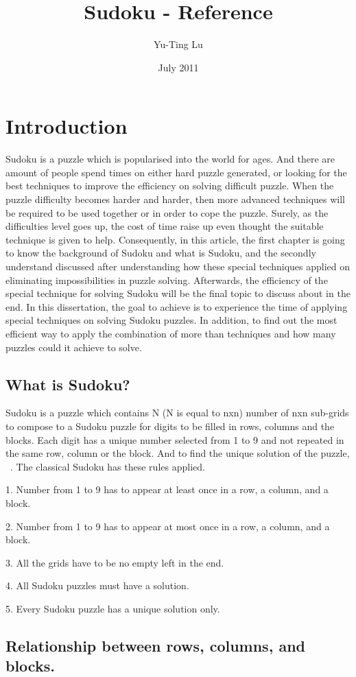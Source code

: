 \documentclass[11pt]{report}
\begin{document}
\title{Sudoku - Reference}
\author{Yu-Ting Lu}
\date{July 2011}
\maketitle

\tableofcontents

\chapter{Introduction}
\label{cha:Introduction}


Sudoku is a puzzle which is popularised into the world for ages. And there are amount of people spend times on either hard puzzle generated, or looking for the best techniques to improve the efficiency on solving difficult puzzle.
When the puzzle difficulty becomes harder and harder, then more advanced techniques will be required to be used together or in order to cope the puzzle. Surely, as the difficulties level goes up, the cost of time raise up even thought the suitable technique is given to help. Consequently, in this article, the first chapter is going to know the background of Sudoku and what is Sudoku, and the secondly understand discussed after understanding how these special techniques applied on eliminating impossibilities in puzzle solving. Afterwards, the efficiency of the special technique for solving Sudoku will be the final topic to discuss about in the end.
In this dissertation, the goal to achieve is to experience the time of applying special techniques on solving Sudoku puzzles. In addition, to find out the most efficient way to apply the combination of more than techniques and how many puzzles could it achieve to solve.


\section{What is Sudoku?}
\label{sec:whatissudoku}

Sudoku is a puzzle which contains N (N is equal to nxn) number of nxn sub-grids to compose to a Sudoku puzzle for digits to be filled in rows, columns and the blocks. Each digit has a unique number selected from 1 to 9 and not repeated in the same row, column or the block.
And to find the unique solution of the puzzle,  ~\cite{Berthier2007Sudoku}.
The classical Sudoku has these rules applied.

1. Number from 1 to 9 has to appear at least once in a row, a column, and a block.

2. Number from 1 to 9 has to appear at most once in a row, a column, and a block.

3. All the grids have to be no empty left in the end.

4. All Sudoku puzzles must have a solution.

5. Every Sudoku puzzle has a unique solution only.


\section{Relationship between rows, columns, and blocks.}
\label{sec:Relationship}

{}

\end{document}
